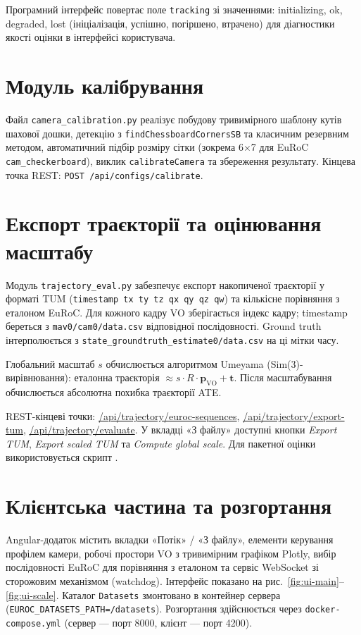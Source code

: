 \documentclass[14pt,a4paper,openany]{extreport}
\begin{document}
Програмний інтерфейс повертає поле \texttt{tracking} зі значеннями:
initializing, ok, degraded, lost
(ініціалізація, успішно, погіршено, втрачено) для діагностики якості оцінки
в інтерфейсі користувача.

\section{Модуль калібрування}

Файл \texttt{camera\_calibration.py} реалізує побудову тривимірного шаблону кутів шахової дошки, детекцію з \texttt{findChessboardCornersSB} та класичним резервним методом, автоматичний підбір розміру сітки (зокрема 6$\times$7 для EuRoC \texttt{cam\_checkerboard}), виклик \texttt{calibrateCamera} та збереження результату. Кінцева точка REST: \texttt{POST /api/configs/calibrate}.

\section{Експорт траєкторії та оцінювання масштабу}

Модуль \texttt{trajectory\_eval.py} забезпечує експорт накопиченої траєкторії у форматі TUM (\texttt{timestamp tx ty tz qx qy qz qw}) та кількісне порівняння з еталоном EuRoC. Для кожного кадру VO зберігається індекс кадру; timestamp береться з \texttt{mav0/cam0/data.csv} відповідної послідовності. Ground truth інтерполюється з \texttt{state\_groundtruth\_estimate0/data.csv} на ці мітки часу.

Глобальний масштаб $s$ обчислюється алгоритмом Umeyama (Sim(3)-вирівнювання):
еталонна траєкторія $\approx s \cdot R \cdot \mathbf{p}_\text{VO} + \mathbf{t}$.
Після масштабування обчислюється абсолютна похибка траєкторії ATE.

REST-кінцеві точки:
\url{/api/trajectory/euroc-sequences},
\url{/api/trajectory/export-tum},
\url{/api/trajectory/evaluate}.
У вкладці «З файлу» доступні кнопки \emph{Export TUM},
\emph{Export scaled TUM} та \emph{Compute global scale}.
Для пакетної оцінки використовується скрипт
.

\section{Клієнтська частина та розгортання}

Angular-додаток містить вкладки «Потік» / «З файлу», елементи керування профілем камери, робочі простори VO з тривимірним графіком Plotly, вибір послідовності EuRoC для порівняння з еталоном та сервіс WebSocket зі сторожовим механізмом (watchdog). Інтерфейс показано на рис.~\ref{fig:ui-main}--\ref{fig:ui-scale}. Каталог \texttt{Datasets} змонтовано в контейнер сервера (\texttt{EUROC\_DATASETS\_PATH=/datasets}). Розгортання здійснюється через \texttt{docker-compose.yml} (сервер --- порт 8000, клієнт --- порт 4200).
\end{document}
